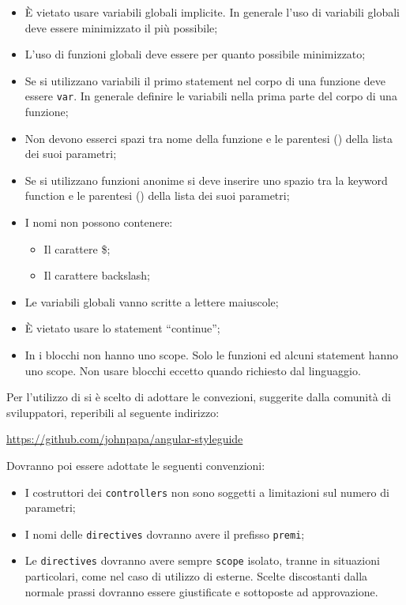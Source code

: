 \begin{itemize}
\item \`{E} vietato usare variabili globali implicite. In generale l'uso di variabili globali deve essere minimizzato il più possibile;
\item L'uso di funzioni globali deve essere per quanto possibile minimizzato;
\item Se si utilizzano variabili il primo statement nel corpo di una funzione deve essere \texttt{var}. In generale definire le variabili nella prima parte del corpo di una funzione;
\item Non devono esserci spazi tra nome della funzione e le parentesi () della lista dei suoi parametri;
\item Se si utilizzano funzioni anonime si deve inserire uno spazio tra la keyword function e le parentesi () della lista dei suoi parametri;
\item I nomi non possono contenere:
\begin{itemize}
\item Il carattere \$;
\item Il carattere backslash;
\end{itemize}
\item Le variabili globali vanno scritte a lettere maiuscole;
\item \`{E} vietato usare lo statement ``continue'';
\item In  i blocchi non hanno uno scope. Solo le funzioni ed alcuni statement hanno uno scope. Non usare blocchi {} eccetto quando richiesto dal linguaggio.
\end{itemize}
\label{normeAngular}
Per l'utilizzo di  si è scelto di adottare le convezioni, suggerite dalla comunità di sviluppatori, reperibili al seguente indirizzo:
\begin{center}
\url{https://github.com/johnpapa/angular-styleguide}
\end{center}
Dovranno poi essere adottate le seguenti convenzioni:
\begin{itemize}
\item I costruttori dei \texttt{controllers} non sono soggetti a limitazioni sul numero di parametri;
\item I nomi delle \texttt{directives} dovranno avere il prefisso \texttt{premi};
\item Le \texttt{directives} dovranno avere sempre \texttt{scope} isolato, tranne in situazioni particolari, come nel caso di utilizzo di  esterne. Scelte discostanti dalla normale prassi dovranno essere giustificate e sottoposte ad approvazione.
\end{itemize}
